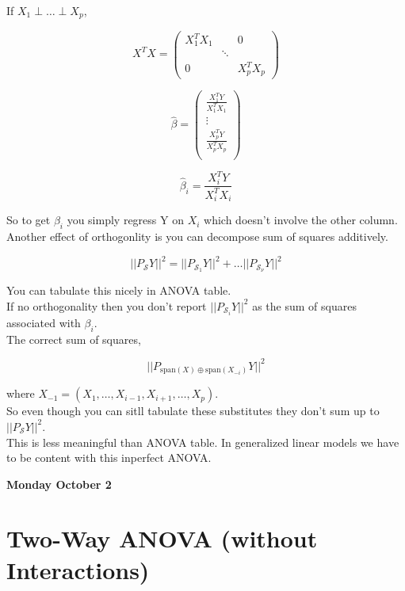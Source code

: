 \documentclass[11pt,fleqn]{book} %
\begin{document}
If $X_1 \perp \dots \perp X_p$, 

		$$X^T X = \begin{pmatrix}
			X_1^T X_1 & & 0 \\
			 & \ddots &  \\
			 0 & & X_p^T X_p
		\end{pmatrix} $$

		$$\hat{\beta} = \begin{pmatrix}
			\frac{X_1^T Y}{X_1^T X_1}\\
			\vdots\\
			\frac{X_p^T Y}{X_p^T X_p}\\
		\end{pmatrix} $$

		$$\hat{\beta}_i = \frac{X_i^T Y}{X_i^T X_i} $$

So to get $\beta_i$ you simply regress Y on $X_i$ which doesn't involve the other column.\\

Another effect of orthogonlity is you can decompose sum of squares additively. 

		$$||P_\mathcal{S} Y ||^2  = ||P_{\mathcal{S}_1} Y ||^2  + \dots ||P_{\mathcal{S}_\nu} Y ||^2 $$

You can tabulate this nicely in ANOVA table. \\

If no orthogonality then you don't report $||P_{\mathcal{S}_i} Y ||^2 $ as the sum of squares associated with $\beta_i$. \\

The correct sum of squares, 

		$$||P_{\text{span}(X) \oplus \text{span}(X_{-i})} Y ||^2$$

where $X_{-1} = (X_1, \dots, X_{i - 1}, X_{i+1}, \dots, X_p)$. \\

So even though you can sitll tabulate these substitutes they don't sum up to $||P_\mathcal{S} Y ||^2 $. \\

This is less meaningful than ANOVA table. In generalized linear models we have to be content with this inperfect ANOVA. 



\textbf{Monday October 2}\\

\section{Two-Way ANOVA (without Interactions)}
\end{document}
